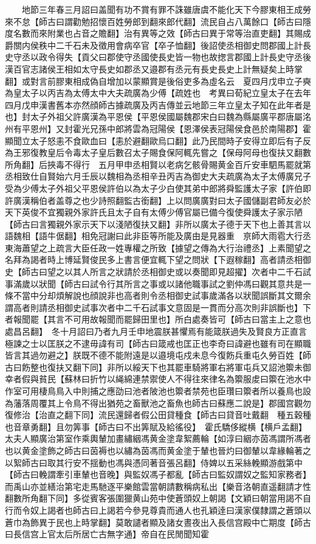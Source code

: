 　　地節三年春三月詔曰盖聞有功不賞有罪不誅雖唐虞不能化天下今膠東相王成勞來不怠【師古曰謂勸勉招懷百姓勞郎到翻來郎代翻】流民自占八萬餘口【師古曰隱度名數而來附業也占音之贍翻】治有異等之效【師古曰異于常等治直吏翻】其賜成爵關内侯秩中二千石未及徵用會病卒官【卒子恤翻】後詔使丞相御史問郡國上計長史守丞以政令得失【貢父曰郡使守丞國使長史皆一物也故揔言郡國上計長史守丞後漢百官志諸侯王相如太守長史如郡丞又邉郡有丞元有長史長史上計無疑矣上時掌翻】或對言前膠東相成偽自增加以蒙顯賞是後俗吏多為虛名云　夏四月戊申立子奭為皇太子以丙吉為太傅太中大夫疏廣為少傅【疏姓也　考異曰荀紀立皇太子在去年四月戊申漢書舊本亦然顔師古據疏廣及丙吉傳並云地節三年立皇太子知在此年者是也】封太子外祖父許廣漢為平恩侯【平恩侯國屬魏郡宋白曰魏為縣屬廣平郡唐屬洺州有平恩州】又封霍光兄孫中郎將雲為冠陽侯【恩澤侯表冠陽侯食邑於南陽郡】霍顯聞立太子怒恚不食歐血曰【恚於避翻歐烏口翻】此乃民間時子安得立即后有子反為王邪復教皇后令毒太子皇后數召太子賜食保阿輒先嘗之【保母阿母也復扶又翻數所角翻】后挾毒不得行　五月甲申丞相賢以老病乞骸骨賜黄金百斤安車駟馬罷就第丞相致仕自賢始六月壬辰以魏相為丞相辛丑丙吉為御史大夫疏廣為太子太傅廣兄子受為少傅太子外祖父平恩侯許伯以為太子少白使其弟中郎將舜監護太子家【許伯即許廣漢稱伯者盖尊之也少詩照翻監古銜翻】上以問廣廣對曰太子國儲副君師友必於天下英俊不宜獨親外家許氏且太子自有太傅少傅官屬已備今復使舜護太子家示陋【師古曰言獨親外家示天下以淺陋復扶又翻】非所以廣太子德于天下也上善其言以語魏相【語牛倨翻】相免冠謝曰此非臣等所能及廣由是見器重　亰師大雨雹大行丞東海蕭望之上疏言大臣任政一姓專權之所致【據望之傳為大行治禮丞】上素聞望之名拜為謁者時上博延賢俊民多上書言便宜輒下望之問狀【下遐稼翻】高者請丞相御史【師古曰望之以其人所言之狀請於丞相御史或以奏聞即見超擢】次者中二千石試事滿歲以狀聞【師古曰試令行其所言之事或以諸他職事試之劉仲馮曰觀其意共是一條不當中分却煩解說也顔說非也高者則令丞相御史試事歲滿各以狀聞誤斷其文爾余謂高者則請丞相御史試事次者中二千石試事文意固是一貫而分高次則非誤斷也】下者報聞罷【其言不可用故報聞而罷歸田里也】所白處奏皆可【師古曰當主上之意也處昌呂翻】　冬十月詔曰乃者九月壬申地震朕甚懼焉有能箴朕過失及賢良方正直言極諫之士以匡朕之不逮毋諱有司【師古曰箴戒也匡正也李奇曰諱避也雖有司在顯職皆言其過勿避之】朕既不德不能附遠是以邉境屯戍未息今復飭兵重屯久勞百姓【師古曰飭整也復扶又翻下同】非所以綏天下也其罷車騎將軍右將軍屯兵又詔池籞未御幸者假與貧民【蘇林曰折竹以䋲綿連禁禦使人不得往來律名為籞服䖍曰籞在池水中作室可用棲鳥鳥入中則捕之應劭曰池者陂池也籞者禁苑也臣瓚曰籞者所以養鳥也設為藩落周覆其上令鳥不得出猶苑之畜獸池之畜魚也師古曰蘇應二說是】郡國宫觀勿復修治【治直之翻下同】流民還歸者假公田貸種食【師古曰貸音吐戴翻　種五穀種也音章勇翻】且勿筭事【師古曰不出筭賦及給徭役】　霍氏驕侈縱横【横戶孟翻】太夫人顯廣治第室作乘輿輦加畫繡絪馮黄金塗韋絮薦輪【如淳曰絪亦茵馮謂所馮者也以黄金塗飾之師古曰茵褥也以繡為茵馮而黄金塗于輦也晉灼曰御輦以韋緣輪著之以絮師古曰取其行安不揺動也馮與憑同著音張呂翻】侍婢以五采絲輓顯游戲第中【師古曰輓謂牽引車輦也音晚】與監奴馮子都亂【師古曰監奴謂奴之監知家務者】而禹山亦並繕治第宅走馬馳逐平樂館雲當朝請數稱病私出【樂音洛朝直遥翻請才性翻數所角翻下同】多從賓客張圍獵黄山苑中使蒼頭奴上朝謁【文穎曰朝當用謁不自行而令奴上謁者也師古曰上謁若今參見尊貴而通人也孔穎逹曰漢家僕隸謂之蒼頭以蒼巾為飾異于民也上時掌翻】莫敢譴者顯及諸女晝夜出入長信宫殿中亡期度【師古曰長信宫上官太后所居亡古無字通】帝自在民閒聞知霍